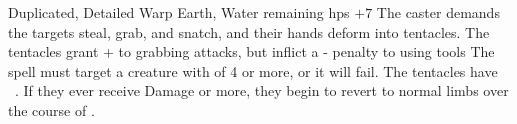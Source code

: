   {Duplicated, Detailed}%
  {Warp}%
  {Earth, Water}%
  {remaining \glspl{hp} $+7$}%
  {The caster demands the targets steal, grab, and snatch, and their hands deform into  tentacles.
  The tentacles grant + to grabbing attacks, but inflict a - penalty to using tools}%
  {
  The spell must target a creature with  of 4 or more, or it will fail.
  The tentacles have ~.
  If they ever receive  Damage or more, they begin to revert to normal limbs over the course of .}
